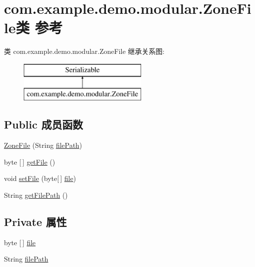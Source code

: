 \hypertarget{classcom_1_1example_1_1demo_1_1modular_1_1_zone_file}{}\section{com.\+example.\+demo.\+modular.\+Zone\+File类 参考}
\label{classcom_1_1example_1_1demo_1_1modular_1_1_zone_file}
类 com.\+example.\+demo.\+modular.\+Zone\+File 继承关系图\+:\begin{figure}[H]
\begin{center}
\leavevmode
\includegraphics[height=2.000000cm]{classcom_1_1example_1_1demo_1_1modular_1_1_zone_file}
\end{center}
\end{figure}
\subsection*{Public 成员函数}
\begin{DoxyCompactItemize}
\item 
\mbox{\hyperlink{classcom_1_1example_1_1demo_1_1modular_1_1_zone_file_aa054f694df08bab5a7a10b7dac389061}{Zone\+File}} (String \mbox{\hyperlink{classcom_1_1example_1_1demo_1_1modular_1_1_zone_file_a9e0b4d946913267359cd80f45e1324a7}{file\+Path}})
\item 
byte \mbox{[}$\,$\mbox{]} \mbox{\hyperlink{classcom_1_1example_1_1demo_1_1modular_1_1_zone_file_a12df840d3119ee332a65b6dedb36cf84}{get\+File}} ()
\item 
void \mbox{\hyperlink{classcom_1_1example_1_1demo_1_1modular_1_1_zone_file_a9d9e3cc4ce0078d00ef3dfb5f4d33171}{set\+File}} (byte\mbox{[}$\,$\mbox{]} \mbox{\hyperlink{classcom_1_1example_1_1demo_1_1modular_1_1_zone_file_adb3febad3ba9542b8b00b32cc84b4507}{file}})
\item 
String \mbox{\hyperlink{classcom_1_1example_1_1demo_1_1modular_1_1_zone_file_ab967f3ab734a0c44937939b860c6d6d6}{get\+File\+Path}} ()
\end{DoxyCompactItemize}
\subsection*{Private 属性}
\begin{DoxyCompactItemize}
\item 
byte \mbox{[}$\,$\mbox{]} \mbox{\hyperlink{classcom_1_1example_1_1demo_1_1modular_1_1_zone_file_adb3febad3ba9542b8b00b32cc84b4507}{file}}
\item 
String \mbox{\hyperlink{classcom_1_1example_1_1demo_1_1modular_1_1_zone_file_a9e0b4d946913267359cd80f45e1324a7}{file\+Path}}
\end{DoxyCompactItemize}
